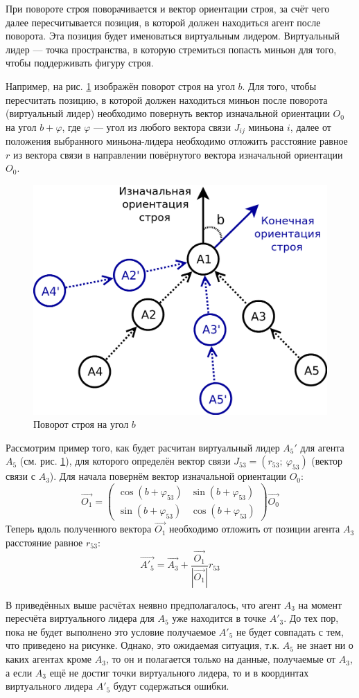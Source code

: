 \documentclass[a4paper, 14pt]{extarticle}
\begin{document}
При повороте строя поворачивается и вектор ориентации строя, за счёт чего далее пересчитывается позиция, в которой должен находиться агент после поворота. Эта позиция будет именоваться виртуальным лидером. Виртуальный лидер — точка пространства, в которую стремиться попасть миньон для того, чтобы поддерживать фигуру строя. \par
Например, на рис. \ref{fig:wedge-platoon-rotation} изображён поворот строя на угол $b$. Для того, чтобы пересчитать позицию, в которой должен находиться миньон после поворота (виртуальный лидер) необходимо повернуть вектор изначальной ориентации $O_{0}$ на угол $b + \varphi$, где $\varphi$ — угол из любого вектора связи $J_{ij}$ миньона $i$, далее от положения выбранного миньона-лидера необходимо отложить расстояние равное $r$ из вектора связи в направлении повёрнутого вектора изначальной ориентации $O_0$. 
\par
\begin{figure}[!htbp]
	\centering
	\includegraphics[width=0.5\linewidth]{platoon/wedge-platoon-rotation}
	\caption{Поворот строя на угол $b$}
	\label{fig:wedge-platoon-rotation}
\end{figure}
Рассмотрим пример того, как будет расчитан виртуальный лидер $A_5'$ для агента $A_5$ (см. рис. \ref{fig:wedge-platoon-rotation}), для которого определён вектор связи $J_{53} = (r_{53}; \ \varphi_{53})$ (вектор связи с $A_3$). Для начала повернём вектор изначальной ориентации $O_{0}$:
$$\vec{O_{1}} =  \left(\begin{array}{cc} \cos{(b + \varphi_{53})} & \sin{(b + \varphi_{53})}\\ \sin{(b + \varphi_{53})} & \cos{(b + \varphi_{53})} \end{array}\right) \vec{O_{0}} $$
Теперь вдоль полученного вектора $\vec{O_1}$ необходимо отложить от позиции агента $A_3$ расстояние равное $r_{53}$:
$$ \vec{A'_{5}} = \vec{A_3} + \frac{\vec{O_1}}{|\vec{O_1}|} r_{53}$$
\par
В приведённых выше расчётах неявно предполагалось, что агент $A_3$ на момент пересчёта виртуального лидера для $A_5$ уже находится в точке $A'_3$. До тех пор, пока не будет выполнено это условие получаемое $A'_5$ не будет совпадать с тем, что приведено на рисунке. Однако, это ожидаемая ситуация, т.к. $A_5$ не знает ни о каких агентах кроме $A_3$, то он и полагается только на данные, получаемые от $A_3$, а если $A_3$ ещё не достиг точки виртуального лидера, то и в координтах виртуального лидера $A'_5$ будут содержаться ошибки. \par
\end{document}
